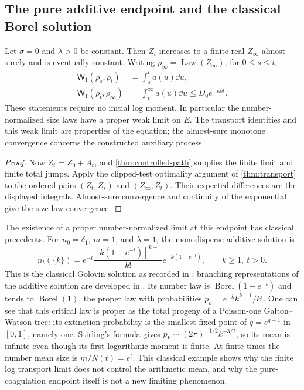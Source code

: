 \subsection{The pure additive endpoint and the classical Borel solution}

\begin{corollary}\label{cor:pure-coag}
Let $\sigma=0$ and $\lambda>0$ be constant. Then $Z_t$ increases to
a finite real $Z_\infty$ almost surely and is eventually constant.
Writing $\rho_\infty=\operatorname{Law}(Z_\infty)$, for $0\leq s\leq t$,
\begin{align}
 \mathsf W_1(\rho_s,\rho_t)&=\int_s^t a(u)\dd u,\label{eq:pure-cost}\\
 \mathsf W_1(\rho_t,\rho_\infty)&=\int_t^\infty a(u)\dd u
                   \leq D_0e^{-\kappa bt}.
 \label{eq:pure-limit}
\end{align}
These statements require no initial log moment. In particular the
number-normalized size laws have a proper weak limit on $E$.
The transport identities and this weak limit are properties of the
equation; the almost-sure monotone convergence concerns the
constructed auxiliary process.
\end{corollary}

\begin{proof}
Now $Z_t=Z_0+A_t$, and \cref{thm:controlled-path} supplies the
finite limit and finite total jumps. Apply the clipped-test
optimality argument of \cref{thm:transport} to the ordered pairs
$(Z_t,Z_s)$ and $(Z_\infty,Z_t)$. Their expected differences are
the displayed integrals. Almost-sure convergence and continuity of
the exponential give the size-law convergence.
\end{proof}

The existence of a proper number-normalized limit at this endpoint
has classical precedents. For $n_0=\delta_1$, $m=1$, and $\lambda=1$,
the monodisperse additive solution is
\begin{equation}
 n_t(\{k\})=e^{-t}\frac{[k(1-e^{-t})]^{k-1}}{k!}
                        e^{-k(1-e^{-t})},\qquad k\geq1,\ t>0.
 \label{eq:classical-Borel}
\end{equation}
This is the classical Golovin solution as recorded in
\citet[equation~(3)]{Bertoin2009}; branching representations of the
additive solution are developed in \citet{DeaconuTanre2000}.
Its number law is $\operatorname{Borel}(1-e^{-t})$ and tends to
$\operatorname{Borel}(1)$, the proper law with probabilities
$p_k=e^{-k}k^{k-1}/k!$. One can see that this critical law is proper
as the total progeny of a Poisson-one Galton--Watson tree: its
extinction probability is the smallest fixed point of
$q=e^{q-1}$ in $[0,1]$, namely one. Stirling's formula gives
$p_k\sim(2\pi)^{-1/2}k^{-3/2}$, so its mean is infinite even
though its first logarithmic moment is finite. At finite times the
number mean size is $m/N(t)=e^t$. This classical example shows why
the finite log transport limit does not control the arithmetic
mean, and why the pure-coagulation endpoint itself is not a new
limiting phenomenon.
